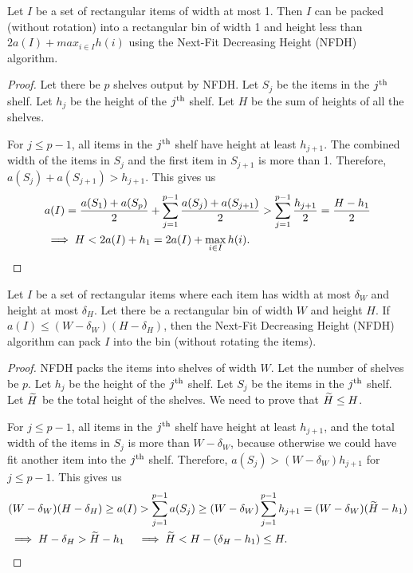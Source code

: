 \begin{lemma}
\label{thm:nfdh-strip}
Let $I$ be a set of rectangular items of width at most 1.
Then $I$ can be packed (without rotation) into a rectangular bin of width 1
and height less than $2a(I) + max_{i \in I} h(i)$
using the Next-Fit Decreasing Height (NFDH) algorithm.
\end{lemma}
\begin{proof}
Let there be $p$ shelves output by NFDH.
Let $S_j$ be the items in the $j^{\textrm{th}}$ shelf.
Let $h_j$ be the height of the $j^{\textrm{th}}$ shelf.
Let $H$ be the sum of heights of all the shelves.

For $j \le p-1$, all items in the $j^{\textrm{th}}$ shelf have height at least $h_{j+1}$.
The combined width of the items in $S_j$ and the first item in $S_{j+1}$ is more than 1.
Therefore, $a(S_j) + a(S_{j+1}) > h_{j+1}$. This gives us
\begin{align*}
& a(I) = \frac{a(S_1) + a(S_p)}{2} + \sum_{j=1}^{p-1} \frac{a(S_j) + a(S_{j+1})}{2}
> \sum_{j=1}^{p-1} \frac{h_{j+1}}{2} = \frac{H-h_1}{2}
\\ &\implies H < 2a(I) + h_1 = 2a(I) + \max_{i \in I} h(i).
\qedhere \end{align*}
\end{proof}

\begin{lemma}
\label{thm:nfdh-small}
Let $I$ be a set of rectangular items where each item has width at most $\delta_W$
and height at most $\delta_H$. Let there be a rectangular bin of width $W$ and height $H$.
If $a(I) \le (W - \delta_W)(H - \delta_H)$, then the Next-Fit Decreasing Height (NFDH)
algorithm can pack $I$ into the bin (without rotating the items).
\end{lemma}
\begin{proof}
NFDH packs the items into shelves of width $W$.
Let the number of shelves be $p$.
Let $h_j$ be the height of the $j^{\textrm{th}}$ shelf.
Let $S_j$ be the items in the $j^{\textrm{th}}$ shelf.
Let $\widetilde{H}$ be the total height of the shelves.
We need to prove that $\widetilde{H} \le H$.

For $j \le p-1$, all items in the $j^{\textrm{th}}$ shelf have height at least $h_{j+1}$,
and the total width of the items in $S_j$ is more than $W-\delta_W$,
because otherwise we could have fit another item into the $j^{\textrm{th}}$ shelf.
Therefore, $a(S_j) > (W-\delta_W)h_{j+1}$ for $j \le p-1$. This gives us
\begin{align*}
& (W - \delta_W)(H - \delta_H) \ge a(I) > \sum_{j=1}^{p-1} a(S_j)
\ge (W-\delta_W)\sum_{j=1}^{p-1} h_{j+1}
= (W-\delta_W)(\widetilde{H} - h_1)
\\ &\implies H - \delta_H > \widetilde{H} - h_1
\quad\implies \widetilde{H} < H - (\delta_H - h_1) \le H.
\qedhere \end{align*}
\end{proof}

